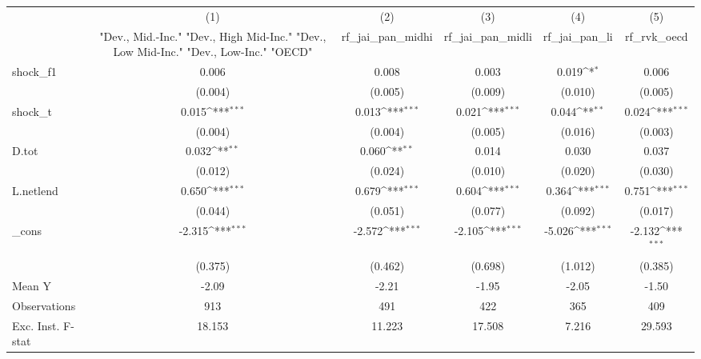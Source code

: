 {
\def\sym#1{\ifmmode^{#1}\else\(^{#1}\)\fi}
\begin{tabular}{l*{5}{c}}
\toprule
            &\multicolumn{1}{c}{(1)}&\multicolumn{1}{c}{(2)}&\multicolumn{1}{c}{(3)}&\multicolumn{1}{c}{(4)}&\multicolumn{1}{c}{(5)}\\
            &\multicolumn{1}{c}{ "Dev., Mid.-Inc." "Dev., High Mid-Inc." "Dev., Low Mid-Inc." "Dev., Low-Inc." "OECD" }&\multicolumn{1}{c}{rf\_jai\_pan\_midhi}&\multicolumn{1}{c}{rf\_jai\_pan\_midli}&\multicolumn{1}{c}{rf\_jai\_pan\_li}&\multicolumn{1}{c}{rf\_rvk\_oecd}\\
\midrule
shock\_f1    &       0.006         &       0.008         &       0.003         &       0.019\sym{*}  &       0.006         \\
            &     (0.004)         &     (0.005)         &     (0.009)         &     (0.010)         &     (0.005)         \\
\addlinespace
shock\_t     &       0.015\sym{***}&       0.013\sym{***}&       0.021\sym{***}&       0.044\sym{**} &       0.024\sym{***}\\
            &     (0.004)         &     (0.004)         &     (0.005)         &     (0.016)         &     (0.003)         \\
\addlinespace
D.tot       &       0.032\sym{**} &       0.060\sym{**} &       0.014         &       0.030         &       0.037         \\
            &     (0.012)         &     (0.024)         &     (0.010)         &     (0.020)         &     (0.030)         \\
\addlinespace
L.netlend   &       0.650\sym{***}&       0.679\sym{***}&       0.604\sym{***}&       0.364\sym{***}&       0.751\sym{***}\\
            &     (0.044)         &     (0.051)         &     (0.077)         &     (0.092)         &     (0.017)         \\
\addlinespace
\_cons      &      -2.315\sym{***}&      -2.572\sym{***}&      -2.105\sym{***}&      -5.026\sym{***}&      -2.132\sym{***}\\
            &     (0.375)         &     (0.462)         &     (0.698)         &     (1.012)         &     (0.385)         \\
\midrule
Mean Y      &       -2.09         &       -2.21         &       -1.95         &       -2.05         &       -1.50         \\
Observations&         913         &         491         &         422         &         365         &         409         \\
Exc. Inst. F-stat&      18.153         &      11.223         &      17.508         &       7.216         &      29.593         \\
\bottomrule
\end{tabular}
}
